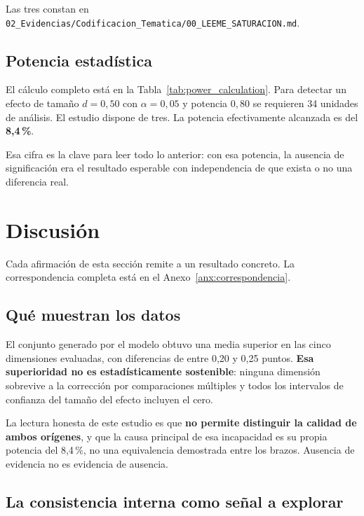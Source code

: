 \documentclass[11pt,a4paper]{article}
\begin{document}
Las tres constan en
\texttt{02\_Evidencias/Codificacion\_Tematica/00\_LEEME\_SATURACION.md}.

\subsection{Potencia estad\'istica}



El c\'alculo completo est\'a en la Tabla~\ref{tab:power_calculation}. Para detectar un efecto de tama\~no $d = 0{,}50$ con $\alpha = 0{,}05$ y potencia
$0{,}80$ se requieren 34 unidades de an\'alisis. El estudio dispone de tres. La potencia
efectivamente alcanzada es del \textbf{8,4\,\%}.

Esa cifra es la clave para leer todo lo anterior: con esa potencia, la ausencia de
significaci\'on era el resultado esperable con independencia de que exista o no una
diferencia real.

\section{Discusi\'on}

Cada afirmaci\'on de esta secci\'on remite a un resultado concreto. La correspondencia
completa est\'a en el Anexo~\ref{anx:correspondencia}.

\subsection{Qu\'e muestran los datos}

El conjunto generado por el modelo obtuvo una media superior en las cinco dimensiones
evaluadas, con diferencias de entre 0,20 y 0,25 puntos. \textbf{Esa superioridad no es
estad\'isticamente sostenible}: ninguna dimensi\'on sobrevive a la correcci\'on por
comparaciones m\'ultiples y todos los intervalos de confianza del tama\~no del efecto
incluyen el cero.

La lectura honesta de este estudio es que \textbf{no permite distinguir la calidad de
ambos or\'igenes}, y que la causa principal de esa incapacidad es su propia potencia del
8,4\,\%, no una equivalencia demostrada entre los brazos. Ausencia de evidencia no es
evidencia de ausencia.

\subsection{La consistencia interna como se\~nal a explorar}
\end{document}
